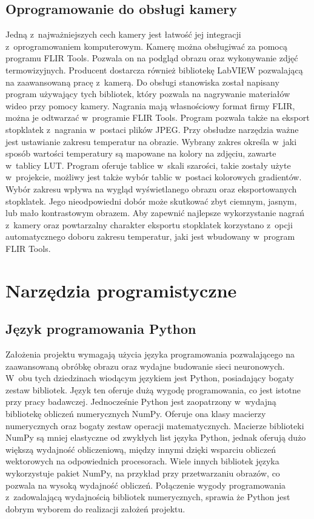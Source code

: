 \subsection{Oprogramowanie do obsługi kamery}
\label{subsec:camera_soft}
Jedną z~najważniejszych cech kamery jest łatwość jej integracji
z~oprogramowaniem komputerowym.
Kamerę można obsługiwać za pomocą programu FLIR Tools.
Pozwala on na podgląd obrazu oraz wykonywanie zdjęć termowizyjnych.
Producent dostarcza również bibliotekę LabVIEW pozwalającą na zaawansowaną
pracę z~kamerą.
Do obsługi stanowiska został napisany program używający tych bibliotek,
który pozwala na nagrywanie materiałów wideo przy pomocy kamery.
Nagrania mają własnościowy format firmy FLIR, można je odtwarzać w~programie
FLIR Tools.
Program pozwala także na eksport stopklatek z~nagrania w~postaci plików JPEG.
Przy obsłudze narzędzia ważne jest ustawianie zakresu temperatur na obrazie.
Wybrany zakres określa w~jaki sposób wartości temperatury są mapowane na
kolory na zdjęciu, zawarte w~tablicy LUT.
Program oferuje tablice w~skali szarości, takie zostały użyte w~projekcie,
możliwy jest także wybór tablic w~postaci kolorowych gradientów.
Wybór zakresu wpływa na wygląd wyświetlanego obrazu oraz eksportowanych
stopklatek.
Jego nieodpowiedni dobór może skutkować zbyt ciemnym, jasnym, lub mało
kontrastowym obrazem.
Aby zapewnić najlepsze wykorzystanie nagrań z~kamery oraz powtarzalny
charakter eksportu stopklatek korzystano z~opcji automatycznego doboru
zakresu temperatur, jaki jest wbudowany w~program FLIR Tools.

\section{Narzędzia programistyczne}

\subsection{Język programowania Python}
Założenia projektu wymagają użycia języka programowania pozwalającego
na zaawansowaną obróbkę obrazu oraz wydajne budowanie sieci neuronowych.
W~obu tych dziedzinach wiodącym językiem jest Python, posiadający bogaty
zestaw bibliotek.
Język ten oferuje dużą wygodę programowania, co jest istotne przy pracy 
badawczej.
Jednocześnie Python jest zaopatrzony w~wydajną bibliotekę obliczeń
numerycznych NumPy.
Oferuje ona klasy macierzy numerycznych oraz bogaty zestaw operacji
matematycznych.
Macierze biblioteki NumPy są mniej elastyczne od zwykłych list języka Python,
jednak oferują dużo większą wydajność obliczeniową, między innymi dzięki
wsparciu obliczeń wektorowych na odpowiednich procesorach.
Wiele innych bibliotek języka wykorzystuje pakiet NumPy, na przykład przy
przetwarzaniu obrazów, co pozwala na wysoką wydajność obliczeń.
Połączenie wygody programowania z~zadowalającą wydajnością bibliotek
numerycznych, sprawia że Python jest dobrym wyborem do realizacji
założeń projektu.

